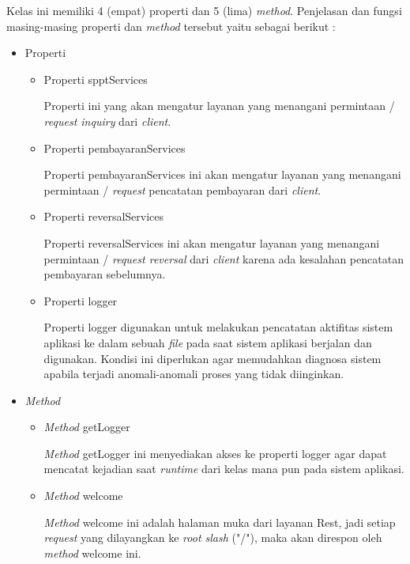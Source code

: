 Kelas ini memiliki 4 (empat) properti dan 5 (lima) \textit{method}. Penjelasan dan fungsi masing-masing properti dan \textit{method} tersebut yaitu sebagai berikut :

\begin{itemize}
  \item Properti
  
  \begin{itemize}
    \item Properti spptServices
    
    Properti ini yang akan mengatur layanan yang menangani permintaan / \textit{request inquiry} dari \textit{client}.
    
    \item Properti pembayaranServices
    
    Properti pembayaranServices ini akan mengatur layanan yang menangani permintaan / \textit{request} pencatatan pembayaran dari \textit{client}.
    
    \item Properti reversalServices
    
    Properti reversalServices ini akan mengatur layanan yang menangani permintaan / \textit{request reversal} dari \textit{client} karena ada kesalahan pencatatan pembayaran sebelumnya.
    
    \item Properti logger
    
    Properti logger digunakan untuk melakukan pencatatan aktifitas sistem aplikasi ke dalam sebuah \textit{file} pada saat sistem aplikasi berjalan dan digunakan. Kondisi ini diperlukan agar memudahkan diagnosa sistem apabila terjadi anomali-anomali proses yang tidak diinginkan.
   
  \end{itemize}
  
  \item \textit{Method}
  
  \begin{itemize}
    \item \textit{Method} getLogger
    
    \textit{Method} getLogger ini menyediakan akses ke properti logger agar dapat mencatat kejadian saat \textit{runtime} dari kelas mana pun pada sistem aplikasi.
    
    \item \textit{Method} welcome
    
    \textit{Method} welcome ini adalah halaman muka dari layanan Rest, jadi setiap \textit{request} yang dilayangkan ke \textit{root slash} ("/"), maka akan direspon oleh \textit{method} welcome ini.
    

\end{itemize}
\end{itemize}
